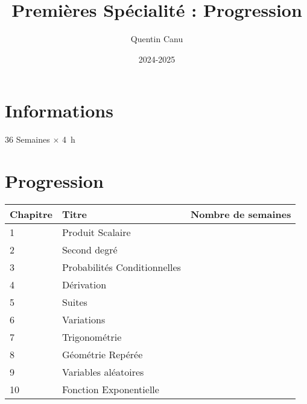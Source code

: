 \documentclass{article}
\title{Premières Spécialité : Progression}
\author{Quentin Canu}
\date{2024-2025}
\begin{document}
\maketitle

\section{Informations}

36 Semaines $\times$ \qty{4}{\hour}

\section{Progression}

\begin{center}
    
\begin{tabular}{|l|p{4cm}|p{2cm}|}
\hline
Chapitre
    & 
Titre
        & 
Nombre de semaines\\
\hline
1   &
Produit Scalaire
        &
\\
\hline
2   &
Second degré
        &
\\
\hline
3   &
Probabilités Conditionnelles
        &
\\
\hline
4   &
Dérivation
        &
\\
\hline
5   &
Suites
        &
\\
\hline
6   &
Variations
        &
\\
\hline
7   &
Trigonométrie
        &
\\
\hline
8   &
Géométrie Repérée
        &
\\
\hline
9   &
Variables aléatoires
        &
\\
\hline
10  &
Fonction Exponentielle
        &
\\
\hline
\end{tabular}
\end{center}
\end{document}

